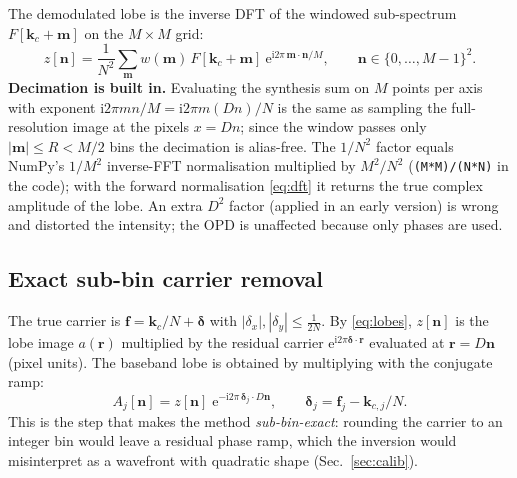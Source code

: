 \documentclass[11pt,a4paper]{article}
\theoremstyle{definition}
\newcommand{\vr}{\bm{r}}
\newcommand{\vf}{\bm{f}}
\newcommand{\ii}{\mathrm{i}}
\newcommand{\ee}{\mathrm{e}}
\newcommand{\code}[1]{\texttt{\small #1}}
\begin{document}
The demodulated lobe is the inverse DFT of the windowed sub-spectrum $F[\bm k_c+\bm m]$ on the $M\times M$ grid:
\begin{equation}
z[\bm n]=\frac1{N^2}\sum_{\bm m}w(\bm m)\,F[\bm k_c+\bm m]\ \ee^{\ii2\pi\,\bm m\cdot\bm n/M},\qquad \bm n\in\{0,\dots,M-1\}^2 .
\label{eq:z}
\end{equation}
\textbf{Decimation is built in.} Evaluating the synthesis sum on $M$ points per axis with exponent $\ii2\pi mn/M=\ii2\pi m(Dn)/N$ is the same as sampling the full-resolution image at the pixels $x=Dn$;
since the window passes only $|\bm m|\le R<M/2$ bins the decimation is alias-free. The $1/N^2$ factor equals NumPy's $1/M^2$ inverse-FFT normalisation multiplied by $M^2/N^2$
(\code{(M*M)/(N*N)} in the code); with the forward normalisation \eqref{eq:dft} it returns the true complex amplitude of the lobe. An extra $D^2$ factor (applied in an early version) is wrong and distorted the intensity; the OPD is unaffected because only phases are used.

\subsection{Exact sub-bin carrier removal}
The true carrier is $\vf=\bm k_c/N+\bm\delta$ with $|\delta_x|,|\delta_y|\le\tfrac1{2N}$. By \eqref{eq:lobes}, $z[\bm n]$ is the lobe image $a(\vr)$ multiplied by the residual carrier $\ee^{\ii2\pi\bm\delta\cdot\vr}$
evaluated at $\vr=D\bm n$ (pixel units). The baseband lobe is obtained by multiplying with the conjugate ramp:
\begin{equation}
A_j[\bm n]=z[\bm n]\;\ee^{-\ii2\pi\,\bm\delta_j\cdot D\bm n},\qquad \bm\delta_j=\vf_j-\bm k_{c,j}/N .
\label{eq:ramp}
\end{equation}
This is the step that makes the method \emph{sub-bin-exact}: rounding the carrier to an integer bin would leave a residual phase ramp, which the inversion would misinterpret as a
wavefront with quadratic shape (Sec.~\ref{sec:calib}).
\end{document}
